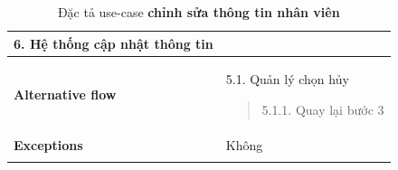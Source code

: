 \begin{longtable}{| p{} | p{} |}
                    6. Hệ thống cập nhật thông tin
                \\
                \hline
                \begin{flushleft}
                    \textbf{Alternative flow}
                \end{flushleft}
                &
                5.1. Quản lý chọn hủy
                    \begin{quote} 
                    5.1.1. Quay lại bước 3
                    \end{quote}
                \\
                \hline
                    \textbf{Exceptions} 
                &
                    Không
                \\
                \hline
                \caption{Đặc tả use-case \textbf{chỉnh sửa thông tin nhân viên}}
            \end{longtable}
    
